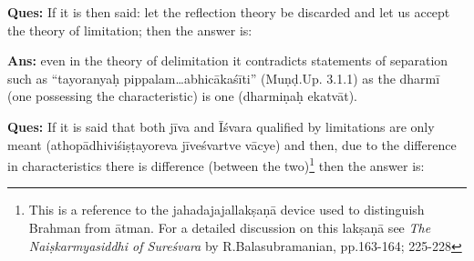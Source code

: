 \vskip 3pt


\vskip 3pt


\vskip 3pt

\textbf{Ques:} If it is then said: let the reflection theory be discarded and let us accept the theory of limitation; then the answer is: 

\vskip 3pt

\textbf{Ans:} even in the theory of delimitation it contradicts statements of separation such as “tayoranyaḥ pippalam…abhicākaśīti” (Muṇḍ.Up. 3.1.1) as the dharmī (one possessing the characteristic) is one (dharmiṇaḥ ekatvāt). 

\vskip 3pt

\textbf{Ques:} If it is said that both jīva and Īśvara qualified by limitations are only meant (athopādhiviśiṣṭayoreva jīveśvartve vācye)  and then, due to the difference in characteristics  there is difference (between the two)\footnote{This is a reference to the jahadajajallakṣaṇā device used to distinguish Brahman from ātman. For a detailed discussion on this lakṣaṇā see \textit{The Naiṣkarmyasiddhi of Sureśvara} by R.Balasubramanian, pp.163-164; 225-228} then the answer is:

